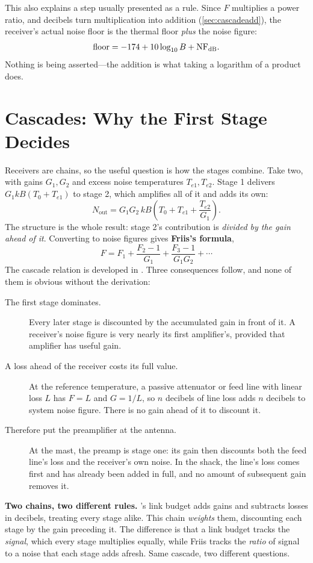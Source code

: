This also explains a step usually presented as a rule. Since \(F\) multiplies a power
ratio, and decibels turn multiplication into addition (\cref{sec:cascadeadd}), the
receiver's actual noise floor is the thermal floor \emph{plus} the noise figure:
\[
\text{floor}=-174+10\log_{10}B+\mathrm{NF}_{\mathrm{dB}}.
\]
Nothing is being asserted---the addition is what taking a logarithm of a product does.

\section{Cascades: Why the First Stage Decides}
\label{sec:friis}
Receivers are chains, so the useful question is how the stages combine. Take two, with
gains \(G_1,G_2\) and excess noise temperatures \(T_{e1},T_{e2}\). Stage 1 delivers
\(G_1kB(T_0+T_{e1})\) to stage 2, which amplifies all of it and adds its own:
\[
N_{\mathrm{out}}=G_1G_2\,kB\!\left(T_0+T_{e1}+\frac{T_{e2}}{G_1}\right).
\]
The structure is the whole result: stage 2's contribution is \emph{divided by the gain
ahead of it}. Converting to noise figures gives \textbf{Friis's formula},
\[
\boxed{\;
F=F_1+\frac{F_2-1}{G_1}+\frac{F_3-1}{G_1G_2}+\cdots\;}
\]
The cascade relation is developed in
\cite[pp.~435--438]{white2004highfrequency}.
Three consequences follow, and none of them is obvious without the derivation:
\begin{description}
\item[The first stage dominates.] Every later stage is discounted by the accumulated
gain in front of it. A receiver's noise figure is very nearly its first amplifier's,
provided that amplifier has useful gain.
\item[A loss ahead of the receiver costs its full value.] At the reference
temperature, a passive attenuator or feed line with linear loss \(L\) has \(F=L\)
and \(G=1/L\), so \(n\) decibels of line loss adds \(n\) decibels to system noise
figure. There is no gain ahead of it to discount it.
\item[Therefore put the preamplifier at the antenna.] At the mast, the preamp is stage
one: its gain then discounts both the feed line's loss and the receiver's own noise. In
the shack, the line's loss comes first and has already been added in full, and no amount
of subsequent gain removes it.
\end{description}

\begin{controlsbox}
\textbf{Two chains, two different rules.} 's link budget adds gains and
subtracts losses in decibels, treating every stage alike. This chain \emph{weights}
them, discounting each stage by the gain preceding it. The difference is that a link
budget tracks the \emph{signal}, which every stage multiplies equally, while Friis tracks
the \emph{ratio} of signal to a noise that each stage adds afresh. Same cascade, two
different questions.
\end{controlsbox}

